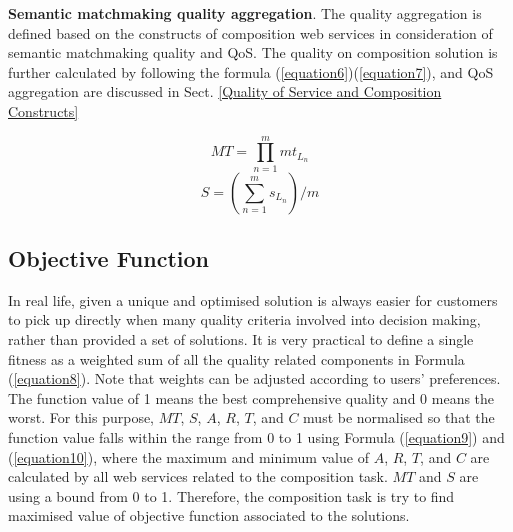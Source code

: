 \documentclass{llncs}
\begin{document}
\textbf{Semantic matchmaking quality aggregation}. The quality aggregation is defined based on the constructs of composition web services in consideration of semantic matchmaking quality and QoS. The quality on composition solution is further calculated by following the formula (\ref{equation6})(\ref{equation7}), and QoS aggregation are discussed in Sect. \ref{Quality of Service and Composition Constructs}

\begin{equation}
\label{equation6}
MT {=} \prod_{n=1}^{m} mt_ {L_{n}}
\end{equation}
\begin{equation}
\label{equation7}
S {=} (\sum_{n=1}^m s_ {L_{n}})/m
\end{equation}


\subsection{Objective Function}
In real life, given a unique and optimised solution is always easier for customers to pick up directly when many quality criteria involved into decision making, rather than provided a set of solutions. It is very practical to define a single fitness as a weighted sum of all the quality related components in Formula (\ref{equation8}). Note that weights can be adjusted according to users' preferences. The function value of 1 means the best comprehensive quality and 0 means the worst. For this purpose, $MT$, $S$, $A$, $R$, $T$, and $C$ must be normalised so that the function value falls within the range from 0 to 1 using Formula (\ref{equation9}) and (\ref{equation10}), where the maximum and minimum value of $A$, $R$, $T$, and $C$ are calculated by all web services related to the composition task. $MT$ and $S$ are using a bound from 0 to 1. Therefore, the composition task is try to find maximised value of objective function associated to the solutions.
\end{document}
